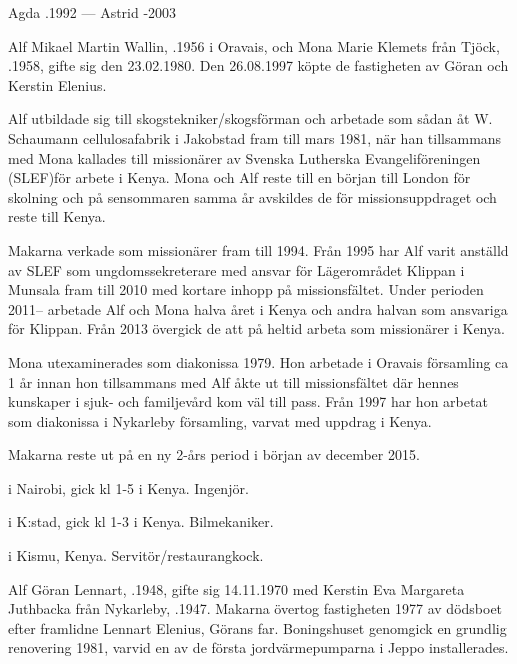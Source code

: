 Agda .1992  ---  Astrid -2003





Alf Mikael Martin Wallin, .1956 i Oravais, och Mona Marie Klemets från Tjöck, .1958, gifte sig den 23.02.1980. Den 26.08.1997 köpte de fastigheten av Göran och Kerstin Elenius.

Alf utbildade sig till skogstekniker/skogsförman och arbetade som sådan åt W. Schaumann cellulosafabrik i Jakobstad fram till mars 1981, när han tillsammans med Mona kallades till missionärer av Svenska Lutherska Evangeliföreningen (SLEF)för arbete i Kenya. Mona och Alf reste till en början till London för skolning och på sensommaren samma år avskildes de för missionsuppdraget och reste till Kenya.

Makarna verkade som missionärer fram till 1994. Från 1995 har Alf varit anställd av SLEF som ungdomssekreterare med ansvar för Lägerområdet Klippan i Munsala fram till 2010 med kortare inhopp på missionsfältet. Under perioden 2011-- arbetade Alf och Mona halva året i Kenya och andra halvan som ansvariga för Klippan. Från 2013 övergick de att på heltid arbeta som missionärer i Kenya.

Mona utexaminerades som diakonissa 1979. Hon arbetade i Oravais församling ca 1 år innan hon tillsammans med Alf åkte ut till missionsfältet där hennes kunskaper i sjuk- och familjevård kom väl till pass. Från 1997 har hon arbetat som diakonissa i Nykarleby församling, varvat med uppdrag i Kenya.

Makarna reste ut på en ny 2-års period i början av december 2015.
\begin{jhchildren}
  \item {} i Nairobi, gick kl 1-5 i Kenya. Ingenjör.
  \item {} i K:stad, gick kl 1-3 i Kenya. Bilmekaniker.
  \item {} i Kismu, Kenya. Servitör/restaurangkock.
\end{jhchildren}


Alf Göran Lennart, .1948, gifte sig 14.11.1970 med Kerstin Eva Margareta Juthbacka från Nykarleby, .1947. Makarna övertog fastigheten 1977 av dödsboet efter framlidne Lennart Elenius, Görans far. Boningshuset genomgick en grundlig renovering 1981, varvid en av de första jordvärmepumparna i Jeppo installerades.

